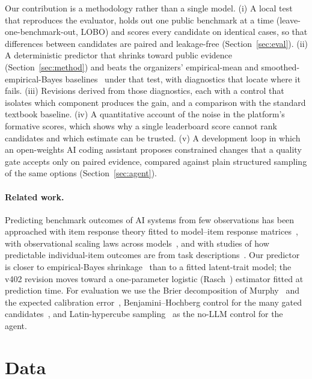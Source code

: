 \documentclass{article}
\begin{document}
Our contribution is a methodology rather than a single model. (i) A local test that reproduces the evaluator, holds out one public benchmark at a time (leave-one-benchmark-out, LOBO) and scores every candidate on identical cases, so that differences between candidates are paired and leakage-free (Section~\ref{sec:eval}). (ii) A deterministic predictor that shrinks toward public evidence (Section~\ref{sec:method}) and beats the organizers' empirical-mean and smoothed-empirical-Bayes baselines~\cite{baselines} under that test, with diagnostics that locate where it fails. (iii) Revisions derived from those diagnostics, each with a control that isolates which component produces the gain, and a comparison with the standard textbook baseline. (iv) A quantitative account of the noise in the platform's formative scores, which shows why a single leaderboard score cannot rank candidates and which estimate can be trusted. (v) A development loop in which an open-weights AI coding assistant proposes constrained changes that a quality gate accepts only on paired evidence, compared against plain structured sampling of the same options (Section~\ref{sec:agent}).

\paragraph{Related work.} Predicting benchmark outcomes of AI systems from few observations has been approached with item response theory fitted to model--item response matrices~\cite{lalor,polo}, with observational scaling laws across models~\cite{ruan}, and with studies of how predictable individual-item outcomes are from task descriptions~\cite{ye}. Our predictor is closer to empirical-Bayes shrinkage~\cite{efron} than to a fitted latent-trait model; the v402 revision moves toward a one-parameter logistic (Rasch~\cite{rasch,lord}) estimator fitted at prediction time. For evaluation we use the Brier decomposition of Murphy~\cite{murphy} and the expected calibration error~\cite{naeini,guo}, Benjamini--Hochberg control for the many gated candidates~\cite{bh}, and Latin-hypercube sampling~\cite{mckay} as the no-LLM control for the agent.

\section{Data}
\label{sec:data}
\end{document}

